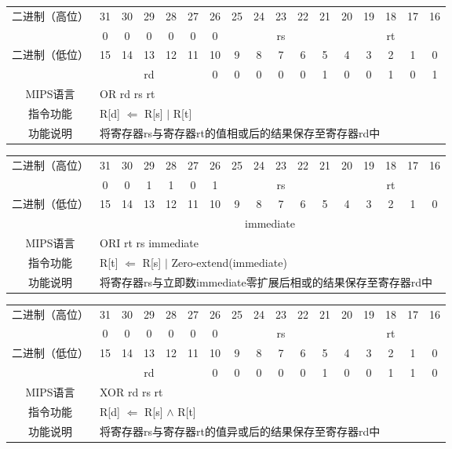\begin{table}
\begin{tabular}{|c|c|c|c|c|c|c|c|c|c|c|c|c|c|c|c|c|}
\hline
\multirow{2}{*}{二进制（高位）} &
31&30&29&28&27&26&25&24&23&22&21&20&19&18&17&16\\
\cline{2-17}
&
0&0&0&0&0&
0&
\multicolumn{5}{c|}{rs}&
\multicolumn{5}{c|}{rt}\\
\hline
\multirow{2}{*}{二进制（低位）} &
15&14&13&12&11&10&9&8&7&6&5&4&3&2&1&0\\
\cline{2-17}
&
\multicolumn{5}{c|}{rd}&
0&0&0&0&0&
1&0&0&1&0&
1\\
\hline
MIPS语言&
\multicolumn{16}{l|}{OR rd rs rt}\\
\hline
指令功能&
\multicolumn{16}{l|}{R[d] $\Leftarrow$ R[s] $\mid$ R[t]}\\
\hline
功能说明&
\multicolumn{16}{l|}{将寄存器rs与寄存器rt的值相或后的结果保存至寄存器rd中}\\
\hline
\end{tabular}
\end{table}

\begin{table}
\begin{tabular}{|c|c|c|c|c|c|c|c|c|c|c|c|c|c|c|c|c|}
\hline
\multirow{2}{*}{二进制（高位）} &
31&30&29&28&27&26&25&24&23&22&21&20&19&18&17&16\\
\cline{2-17}
&
0&0&1&1&0&
1&
\multicolumn{5}{c|}{rs}&
\multicolumn{5}{c|}{rt}\\
\hline
\multirow{2}{*}{二进制（低位）} &
15&14&13&12&11&10&9&8&7&6&5&4&3&2&1&0\\
\cline{2-17}
&
\multicolumn{16}{c|}{immediate}\\
\hline
MIPS语言&
\multicolumn{16}{l|}{ORI rt rs immediate}\\
\hline
指令功能&
\multicolumn{16}{l|}{R[t] $\Leftarrow$ R[s] $\mid$ Zero-extend(immediate)}\\
\hline
功能说明&
\multicolumn{16}{l|}{将寄存器rs与立即数immediate零扩展后相或的结果保存至寄存器rd中}\\
\hline
\end{tabular}
\end{table}

\begin{table}
\begin{tabular}{|c|c|c|c|c|c|c|c|c|c|c|c|c|c|c|c|c|}
\hline
\multirow{2}{*}{二进制（高位）} &
31&30&29&28&27&26&25&24&23&22&21&20&19&18&17&16\\
\cline{2-17}
&
0&0&0&0&0&
0&
\multicolumn{5}{c|}{rs}&
\multicolumn{5}{c|}{rt}\\
\hline
\multirow{2}{*}{二进制（低位）} &
15&14&13&12&11&10&9&8&7&6&5&4&3&2&1&0\\
\cline{2-17}
&
\multicolumn{5}{c|}{rd}&
0&0&0&0&0&
1&0&0&1&1&
0\\
\hline
MIPS语言&
\multicolumn{16}{l|}{XOR rd rs rt}\\
\hline
指令功能&
\multicolumn{16}{l|}{R[d] $\Leftarrow$ R[s] $\land$ R[t]}\\
\hline
功能说明&
\multicolumn{16}{l|}{将寄存器rs与寄存器rt的值异或后的结果保存至寄存器rd中}\\
\hline
\end{tabular}
\end{table}


